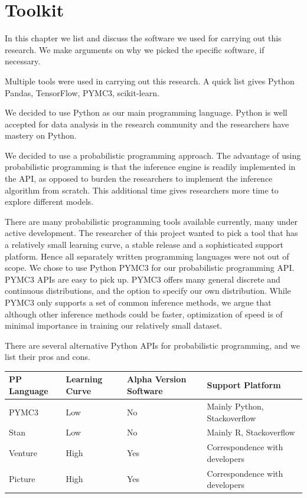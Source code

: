 \documentclass[]{article}
\begin{document}
\section{Toolkit}

In this chapter we list and discuss the software we used for carrying out this research. We make arguments on why we picked the specific software, if necessary.

Multiple tools were used in carrying out this research. A quick list gives Python Pandas\cite{pandas}, TensorFlow\cite{tensorflow}, PYMC3\cite{pymc3}, scikit-learn\cite{scikitlearn}. 

We decided to use Python as our main programming language. Python is well accepted for data analysis in the research community and the researchers have mastery on Python.

We decided to use a probabilistic programming approach. The advantage of using probabilistic programming is that the inference engine is readily implemented in the API, as opposed to burden the researchers to implement the inference algorithm from scratch\cite[p.4]{ghah}. This additional time gives researchers more time to explore different models. 

There are many probabilistic programming tools available currently, many under active development. The researcher of this project wanted to pick a tool that has a relatively small learning curve, a stable release and a sophisticated support platform. Hence all separately written programming languages were not out of scope. We chose to use Python PYMC3 for our probabilistic programming API. PYMC3 APIs are easy to pick up. PYMC3 offers many general discrete and continuous distributions, and the option to specify our own distribution.\cite{pymc3} While PYMC3 only supports a set of common inference methods, we argue that although other inference methods could be faster, optimization of speed is of minimal importance in training our relatively small dataset.

There are several alternative Python APIs for probabilistic programming, and we list their pros and cons.

\begin{center}
    \begin{tabular}{| l | l | l | l |}
    \hline
     PP Language& Learning Curve & Alpha Version Software & Support Platform\\ 
    \hline
    PYMC3 & Low &No & Mainly Python, Stackoverflow\\ 
    Stan\cite{pystan}& Low &No & Mainly R, Stackoverflow\\ 
    Venture & High & Yes & Correspondence with developers\\
    Picture & High & Yes & Correspondence with developers\\
    \hline
    \end{tabular}
\end{center}
\end{document}
